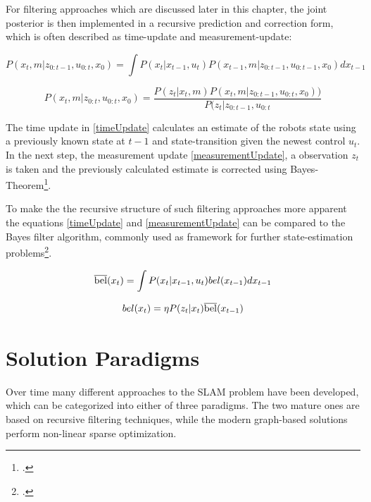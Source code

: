 
For filtering approaches which are discussed later in this chapter, the joint posterior is then implemented in a recursive prediction and correction form, which is often described as time-update and measurement-update:

\begin{equation}\label{timeUpdate}
	P(x_{t}, m | z_{0:t-1}, u_{0:t}, x_{0}) = \int P(x_{t} | x_{t-1}, u_{t}) P(x_{t-1}, m | z_{0:t-1}, u_{0:t-1}, x_{0}) dx_{t-1}
\end{equation}


\begin{equation}\label{measurementUpdate}
	P(x_{t}, m | z_{0:t}, u_{0:t}, x_{0}) = \frac{P(z_{t} | x_{t}, m) P(x_{t}, m | z_{0:t-1}, u_{0:t}, x_{0}))}{P(z_{t} | z_{0:t-1}, u_{0:t}}
\end{equation}

The time update in \ref{timeUpdate} calculates an estimate of the robots state using a previously known state at $ t - 1 $ and state-transition given the newest control $ u_{t} $.
In the next step, the measurement update \ref{measurementUpdate}, a observation $z_{t} $ is taken and the previously calculated estimate is corrected using Bayes-Theorem\footcite{durrantSlam2006}. 

To make the the recursive structure of such filtering approaches more apparent the equations \ref{timeUpdate} and \ref{measurementUpdate} can be compared to the Bayes filter algorithm, commonly used as framework for further state-estimation problems\footcite[Page 23]{thrun2002probabilisticRobotics}.

\begin{equation}\label{timeUpdateBayes}
	\overline{\rm bel}(x_{t}) = \int P(x_{t} | x_{t-1}, u_{t})  bel(x_{t-1}) dx_{t-1}
\end{equation}


\begin{equation}\label{measurementUpdateBayes}
	bel(x_{t}) = \eta  P(z_{t} | x_{t})  \overline{\rm bel}(x_{t-1})
\end{equation}

\section{Solution Paradigms} 
Over time many different approaches to the SLAM problem have been developed, which can be categorized into either of three paradigms. The two mature ones are based on recursive filtering techniques, while the modern graph-based solutions perform non-linear sparse optimization.

